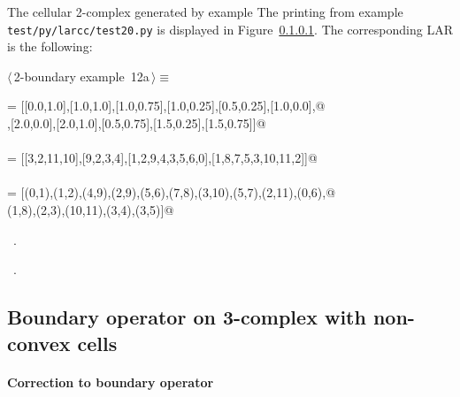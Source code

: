\documentclass[11pt,oneside]{article}    %
\begin{document}
The cellular 2-complex generated by example \texttt{}The printing from example \texttt{test/py/larcc/test20.py} is displayed in Figure~\ref{}.
The corresponding LAR is the following:
\begin{flushleft} \small \label{scrap20}
\protect{}$\langle\,$2-boundary example\nobreak\ {\footnotesize 12a}$\,\rangle\equiv$
\vspace{-1ex}
\begin{list}{}{} \item
\mbox{}\verb@V = [[0.0,1.0],[1.0,1.0],[1.0,0.75],[1.0,0.25],[0.5,0.25],[1.0,0.0],@\\
\mbox{}\verb@[0.0,0.0],[2.0,0.0],[2.0,1.0],[0.5,0.75],[1.5,0.25],[1.5,0.75]]@\\
\mbox{}\verb@@\\
\mbox{}\verb@FV = [[3,2,11,10],[9,2,3,4],[1,2,9,4,3,5,6,0],[1,8,7,5,3,10,11,2]]@\\
\mbox{}\verb@@\\
\mbox{}\verb@EV = [(0,1),(1,2),(4,9),(2,9),(5,6),(7,8),(3,10),(5,7),(2,11),(0,6),@\\
\mbox{}\verb@(1,8),(2,3),(10,11),(3,4),(3,5)]@\\
\mbox{}\verb@@{\NWsep}
\end{list}
\vspace{-1ex}
\footnotesize\addtolength{\baselineskip}{-1ex}
\begin{list}{}{\setlength{\itemsep}{-\parsep}\setlength{\itemindent}{-\leftmargin}}
\item \NWtxtMacroDefBy\ .
\item \NWtxtMacroRefIn\ .
\end{list}
\end{flushleft}


\subsection{Boundary operator on 3-complex with non-convex cells}

\paragraph{Correction to boundary operator}
\end{document}
